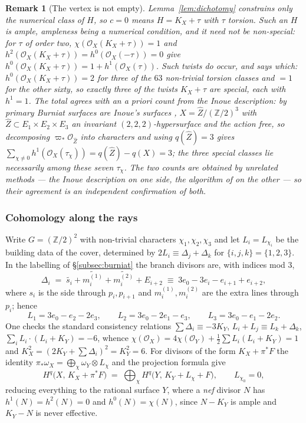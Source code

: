 \documentclass[10pt,a4paper]{amsart}
\newtheorem{remark}[theorem]{Remark}
\newcommand{\OO}{\mathcal{O}}
\newcommand{\ZZ}{\mathbb{Z}}
\begin{document}
\begin{remark}[The vertex is not empty]\label{rem:vertex}
Lemma~\ref{lem:dichotomy} constrains only the \emph{numerical} class of $H$, so $c=0$ means $H=K_X+\tau$ with $\tau$ torsion. Such an $H$ is ample, ampleness being a numerical condition, and it need not be non-special: for $\tau$ of order two, $\chi(\OO_X(K_X+\tau))=1$ and $h^2(\OO_X(K_X+\tau))=h^0(\OO_X(-\tau))=0$ give $h^0(\OO_X(K_X+\tau))=1+h^1(\OO_X(\tau))$. Such twists do occur, and \cite[Prop.~4.7]{Cho26} says which: $h^0(\OO_X(K_X+\tau))=2$ for three of the $63$ non-trivial torsion classes and $=1$ for the other sixty, so exactly three of the twists $K_X+\tau$ are special, each with $h^1=1$. The total agrees with an a priori count from the Inoue description: by \cite{BC11} primary Burniat surfaces are Inoue's surfaces \cite{Ino94}, $X=\widehat Z/(\ZZ/2)^3$ with $\widehat Z\subset E_1\times E_2\times E_3$ an invariant $(2,2,2)$-hypersurface and the action free, so decomposing $\varpi_*\OO_{\widehat Z}$ into characters and using $q(\widehat Z)=3$ gives $\sum_{\chi\neq0}h^1(\OO_X(\tau_\chi))=q(\widehat Z)-q(X)=3$; the three special classes lie necessarily among these seven $\tau_\chi$. The two counts are obtained by unrelated methods --- the Inoue description on one side, the algorithm of \cite{Cho26} on the other --- so their agreement is an independent confirmation of both.
\end{remark}

\subsubsection{Cohomology along the rays}
Write $G=(\ZZ/2)^2$ with non-trivial characters $\chi_1,\chi_2,\chi_3$ and let $L_i=L_{\chi_i}$ be the building data of the cover, determined by $2L_i\equiv\Delta_j+\Delta_k$ for $\{i,j,k\}=\{1,2,3\}$. In the labelling of \S\ref{subsec:burniat} the branch divisors are, with indices mod $3$,
\[
\Delta_i\;=\;\widetilde{s_i}+\widetilde{m_i^{(1)}}+\widetilde{m_i^{(2)}}+E_{i+2}
\;\equiv\;3e_0-3e_i-e_{i+1}+e_{i+2},
\]
where $s_i$ is the side through $p_i,p_{i+1}$ and $m_i^{(1)},m_i^{(2)}$ are the extra lines through $p_i$; hence
\[
L_1=3e_0-e_2-2e_3,\qquad L_2=3e_0-2e_1-e_3,\qquad L_3=3e_0-e_1-2e_2 .
\]
One checks the standard consistency relations $\sum\Delta_i\equiv-3K_Y$, $L_i+L_j\equiv L_k+\Delta_k$, $\sum_iL_i\cdot(L_i+K_Y)=-6$, whence $\chi(\OO_X)=4\chi(\OO_Y)+\tfrac12\sum L_i(L_i+K_Y)=1$ and $K_X^2=(2K_Y+\sum\Delta_i)^2=K_Y^2=6$. For divisors of the form $K_X+\pi^*F$ the identity $\pi_*\omega_X=\bigoplus_\chi\omega_Y\otimes L_\chi$ and the projection formula give
\begin{equation}\label{eq:eigen}
H^q\bigl(X,\,K_X+\pi^*F\bigr)\;=\;\bigoplus_{\chi}H^q\bigl(Y,\,K_Y+L_\chi+F\bigr),
\qquad L_{\chi_0}=0 ,
\end{equation}
reducing everything to the rational surface $Y$, where a \emph{nef} divisor $N$ has $h^1(N)=h^2(N)=0$ and $h^0(N)=\chi(N)$, since $N-K_Y$ is ample and $K_Y-N$ is never effective.
\end{document}
